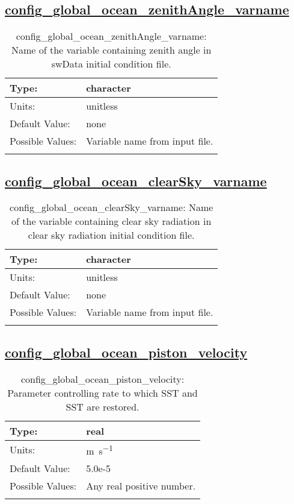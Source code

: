 \subsection[config\_global\_ocean\_zenithAngle\_varname]{\hyperref[sec:nm_tab_global_ocean]{config\_global\_ocean\_zenithAngle\_varname}}
\label{subsec:nm_sec_config_global_ocean_zenithAngle_varname}
\begin{center}
\begin{longtable}{| p{2.0in} || p{4.0in} |}
    \hline
    Type: & character \\
    \hline
    Units: & \si{unitless} \\
    \hline
    Default Value: & none \\
    \hline
    Possible Values: & Variable name from input file. \\
    \hline
    \caption{config\_global\_ocean\_zenithAngle\_varname: Name of the variable containing zenith angle in swData initial condition file.}
\end{longtable}
\end{center}
\subsection[config\_global\_ocean\_clearSky\_varname]{\hyperref[sec:nm_tab_global_ocean]{config\_global\_ocean\_clearSky\_varname}}
\label{subsec:nm_sec_config_global_ocean_clearSky_varname}
\begin{center}
\begin{longtable}{| p{2.0in} || p{4.0in} |}
    \hline
    Type: & character \\
    \hline
    Units: & \si{unitless} \\
    \hline
    Default Value: & none \\
    \hline
    Possible Values: & Variable name from input file. \\
    \hline
    \caption{config\_global\_ocean\_clearSky\_varname: Name of the variable containing clear sky radiation in clear sky radiation initial condition file.}
\end{longtable}
\end{center}
\subsection[config\_global\_ocean\_piston\_velocity]{\hyperref[sec:nm_tab_global_ocean]{config\_global\_ocean\_piston\_velocity}}
\label{subsec:nm_sec_config_global_ocean_piston_velocity}
\begin{center}
\begin{longtable}{| p{2.0in} || p{4.0in} |}
    \hline
    Type: & real \\
    \hline
    Units: & \si{m.s^{-1}} \\
    \hline
    Default Value: & 5.0e-5 \\
    \hline
    Possible Values: & Any real positive number. \\
    \hline
    \caption{config\_global\_ocean\_piston\_velocity: Parameter controlling rate to which SST and SST are restored.}
\end{longtable}
\end{center}
